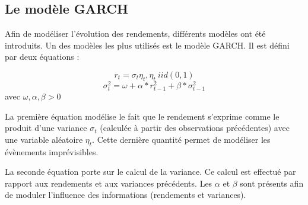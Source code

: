 



		\subsection{Le modèle GARCH}
		\label{subsubsection:modele-garch}
			Afin de modéliser l'évolution des rendements, différents modèles ont été introduits. Un des modèles les plus utilisés est le modèle GARCH.
			Il est défini par deux équations :

			\[r_t = \sigma_t\eta_t , \eta_t~iid(0,1)\]
			\[\sigma_t^2 = \omega+\alpha*r_{t-1}^2+\beta*\sigma_{t-1}^2\] avec $\omega, \alpha, \beta > 0$

			La première équation modélise le fait que le rendement s'exprime comme le produit d'une variance $\sigma_t$ (calculée à partir des observations précédentes) avec une variable aléatoire $\eta_t$. Cette dernière quantité permet de modéliser les évènements imprévisibles.

			La seconde équation porte sur le calcul de la variance. Ce calcul est effectué par rapport aux rendements et aux variances précédents. Les $\alpha$ et $\beta$ sont présents afin de moduler l'influence des informations (rendements et variances).

